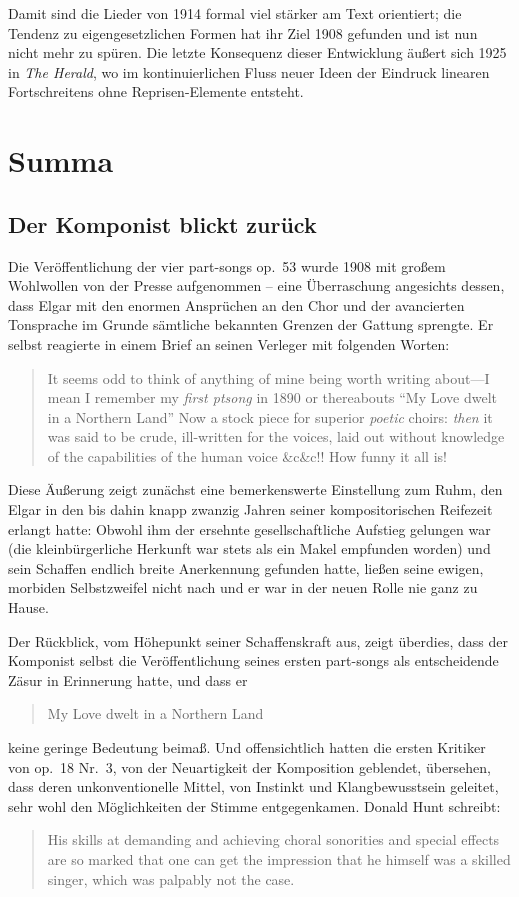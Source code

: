\documentclass[a4paper,11pt,open=any]{scrbook}
\newcommand{\engquote}[1]{\foreignblockquote{english}{#1}}
\begin{document}
Damit sind die Lieder von 1914 formal viel stärker am Text orientiert; die
Tendenz zu eigengesetzlichen Formen hat ihr Ziel 1908 gefunden und ist nun
nicht mehr zu spüren.  Die letzte Konsequenz dieser Entwicklung äußert sich
1925 in \textit{The Herald}, wo im kontinuierlichen Fluss neuer Ideen der
Eindruck linearen Fortschreitens ohne Reprisen-Elemente entsteht.



\chapter{Summa}

\section{Der Komponist blickt zurück}
Die Veröffentlichung der vier part-songs op.~53 wurde 1908 mit großem
Wohlwollen von der Presse aufgenommen – eine Überraschung angesichts dessen,
dass Elgar mit den enormen Ansprüchen an den Chor und der avancierten
Tonsprache im Grunde sämtliche bekannten Grenzen der Gattung sprengte.  Er
selbst reagierte in einem Brief an seinen Verleger mit folgenden Worten:

\engquote{It seems odd to think of anything of mine being worth writing
about—I mean I remember my \emph{first ptsong} in 1890 or thereabouts
\enquote{My Love dwelt in a Northern Land} Now a stock piece for superior
\emph{poetic} choirs: \emph{then} it was said to be crude, ill-written for
the voices, laid out without knowledge of the capabilities of the human
voice \&c\&c!!  How funny it all is!\cite[Bd.~2, S.~693]{elgar-publ}}

Diese Äußerung zeigt zunächst eine bemerkenswerte Einstellung zum Ruhm,
den Elgar in den bis dahin knapp zwanzig Jahren seiner kompositorischen
Reifezeit erlangt hatte: Obwohl ihm der ersehnte gesellschaftliche Aufstieg
gelungen war (die kleinbürgerliche Herkunft war stets als ein Makel empfunden
worden) und sein Schaffen endlich breite Anerkennung gefunden hatte, ließen
seine ewigen, morbiden Selbstzweifel nicht nach und er war in der neuen
Rolle nie ganz zu Hause.

Der Rückblick, vom Höhepunkt seiner Schaffenskraft aus, zeigt überdies,
dass der Komponist selbst die Veröffentlichung seines ersten part-songs
als entscheidende Zäsur in Erinnerung hatte, und dass er \engquote{My Love
dwelt in a Northern Land} keine geringe Bedeutung beimaß.  Und offensichtlich
hatten die ersten Kritiker von op.~18 Nr.~3, von der Neuartigkeit der
Komposition geblendet, übersehen, dass deren unkonventionelle Mittel, von
Instinkt und Klangbewusstsein geleitet, sehr wohl den Möglichkeiten der
Stimme entgegenkamen.  Donald Hunt schreibt: \engquote{His skills at
demanding and achieving choral sonorities and special effects are so
marked that one can get the impression that he himself was a skilled
singer, which was palpably not the case.}\cite[S.~xi]{ece13}
\end{document}
